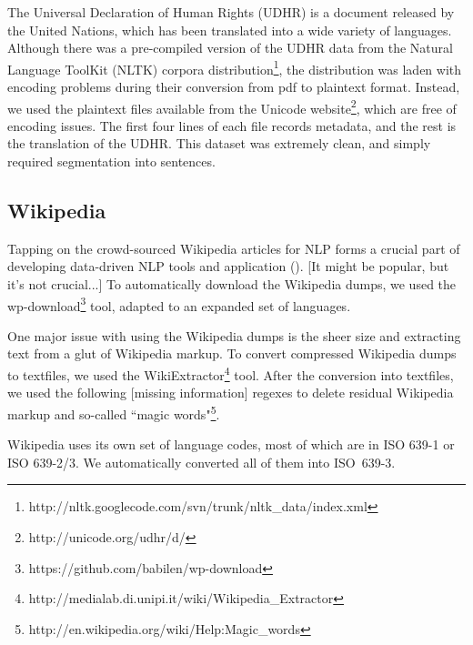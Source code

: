 \documentclass[11pt]{article}
\begin{document}
The Universal Declaration of Human Rights (UDHR) is a document released by the United Nations, which has been translated into a wide variety of languages. Although there was a pre-compiled version of the UDHR data from the Natural Language ToolKit (NLTK) corpora distribution\footnote{http://nltk.googlecode.com/svn/trunk/nltk\_data/index.xml}, the distribution was laden with encoding problems during their conversion from pdf to plaintext format. Instead, we used the plaintext files available from the Unicode website\footnote{http://unicode.org/udhr/d/}, which are free of encoding issues. The first four lines of each file records metadata, and the rest is the translation of the UDHR. This dataset was extremely clean, and simply required segmentation into sentences.

\subsection{Wikipedia}

Tapping on the crowd-sourced Wikipedia articles for NLP forms a crucial part of developing data-driven NLP tools and application ({\color{red}{citation needed}}). [It might be popular, but it's not crucial...] To automatically download the Wikipedia dumps, we used the wp-download\footnote{https://github.com/babilen/wp-download} tool, adapted to an expanded set of languages.



\noindent One major issue with using the Wikipedia dumps is the sheer size and extracting text from a glut of Wikipedia markup. To convert compressed Wikipedia dumps to textfiles, we used the WikiExtractor\footnote{http://medialab.di.unipi.it/wiki/Wikipedia\_Extractor} tool. After the conversion into textfiles, we used the following [missing information] regexes to delete residual Wikipedia markup and so-called ``magic words"\footnote{http://en.wikipedia.org/wiki/Help:Magic\_words}.

Wikipedia uses its own set of language codes, most of which are in ISO 639-1 or ISO 639-2/3. We automatically converted all of them into ISO~639-3.
\end{document}
